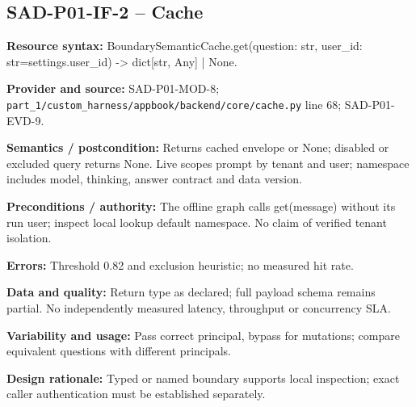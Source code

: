 \documentclass[10pt,letterpaper]{article}
\begin{document}
\subsection{SAD-P01-IF-2 -- Cache}
{\raggedright \textbf{Resource syntax:} BoundarySemanticCache.get(\allowbreak{}question: str, user\_\allowbreak{}id: str=settings.user\_\allowbreak{}id) -> dict[str, Any] | None.\par}
\textbf{Provider and source:} SAD-P01-MOD-8; \nolinkurl{part_1/custom_harness/appbook/backend/core/cache.py} line 68; SAD-P01-EVD-9.\par
\textbf{Semantics / postcondition:} Returns cached envelope or None; disabled or excluded query returns None. Live scopes prompt by tenant and user; namespace includes model, thinking, answer contract and data version.\par
\textbf{Preconditions / authority:} The offline graph calls get(message) without its run user; inspect local lookup default namespace. No claim of verified tenant isolation.\par
\textbf{Errors:} Threshold 0.82 and exclusion heuristic; no measured hit rate.\par
\textbf{Data and quality:} Return type as declared; full payload schema remains partial. No independently measured latency, throughput or concurrency SLA.\par
\textbf{Variability and usage:} Pass correct principal, bypass for mutations; compare equivalent questions with different principals.\par
\textbf{Design rationale:} Typed or named boundary supports local inspection; exact caller authentication must be established separately.\par
\end{document}
